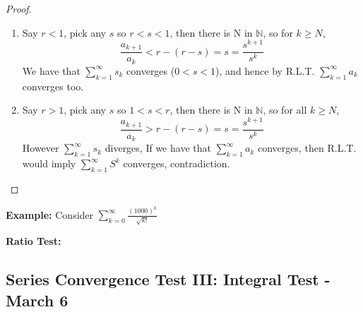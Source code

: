 \documentclass[12pt]{article}
\theoremstyle{plain}
\newcommand{\mN}{{\mathbb{N}}}
\begin{document}
\begin{proof}
	$ $
	\begin{enumerate}
	\item
	Say $r < 1$, pick any $s$ so $r < s < 1$, then there is N in $\mN$, so
	for $k \geq N$, 
	\[
		\frac{a_{k+1}}{a_k} < r-(r-s) = s = \frac{s^{k+1}}{s^k} 
	\]
	We have that $\sum_{k=1}^{\infty} s_k$ converges ($0 < s < 1$), and hence
	by R.L.T. $\sum_{k=1}^{\infty} a_k$ converges too. 

	\item
	Say $r > 1$, pick any $s$ so $1 < s < r$, then there is N in $\mN$, so
	for all $k \geq N$, 
	\[
		\frac{a_{k+1}}{a_k} > r-(r-s) = s = \frac{s^{k+1}}{s^k} 
	\]
	However $\sum_{k=1}^{\infty} s_k$ diverges, If we have that 
	$\sum_{k=1}^{\infty} a_k$ converges, then R.L.T. would imply 
	$\sum_{k=1}^{\infty} S^k$ converges, contradiction.  
	\end{enumerate}
\end{proof}

{\color{Brown}
	\textbf{Example: }
	Consider $\sum_{k=0}^{\infty} \frac{(1000)^k}{\sqrt{k!}}$

	\textbf{Ratio Test: }


}

\subsection{Series Convergence Test III: Integral Test - March 6}
\end{document}
